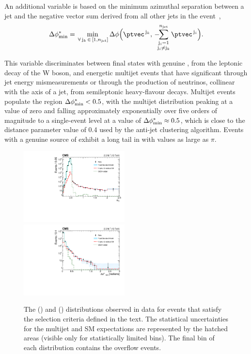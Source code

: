 An additional variable is based on the minimum azimuthal separation
between a jet and the negative vector \ptvec sum derived from all
other jets in the event~\cite{RA1Paper},
\begin{equation}
  \bdphi = \min_{\,\forall\, \mathrm{j}_k\,\in\, [1,\njet]}
  \Delta\phi \Bigl( \ptvec^{\,\mathrm{j}_k}, \,
    -\hspace{-0.5em}\sum_{\substack{\mathrm{j}_i= 1 \\ \mathrm{j}_i \ne \mathrm{j}_k}}^{\njet}
    \ptvec^{\,\mathrm{j}_i} \Bigr).
  \label{eq:bdphi}
\end{equation}

This variable discriminates between final states with genuine
\ptvecmiss, \eg from the leptonic decay of the W boson, and energetic
multijet events that have significant \ptvecmiss through jet energy
mismeasurements or through the production of neutrinos, collinear with
the axis of a jet, from semileptonic heavy-flavour decays. Multijet
events populate the region $\Delta\phi^{*}_\text{min} < 0.5$, with the multijet
distribution peaking at a value of zero and falling approximately
exponentially over five orders of magnitude to a single-event level at
a value of $\Delta\phi^{*}_\text{min} \approx 0.5$, which is close to the distance
parameter value of 0.4 used by the anti-\kt jet clustering
algorithm. Events with a genuine source of \ptvecmiss exhibit a long
tail in \bdphi with values as large as $\pi$.

\begin{figure}[!htb]
  \centering
    \includegraphics[width=0.49\textwidth]{Figure_001-a.pdf} \,
    \includegraphics[width=0.49\textwidth]{Figure_001-b.pdf} \\
  \caption{
    The (\cmsLeft) \alphat and (\cmsRight) \bdphi distributions observed in
    data for events that satisfy the selection criteria defined in the
    text. The statistical uncertainties for the multijet and SM
    expectations are represented by the hatched areas (visible only
    for statistically limited bins). The final bin of each
    distribution contains the overflow events.  }
  \label{fig:alphat-bdphi}
\end{figure}

